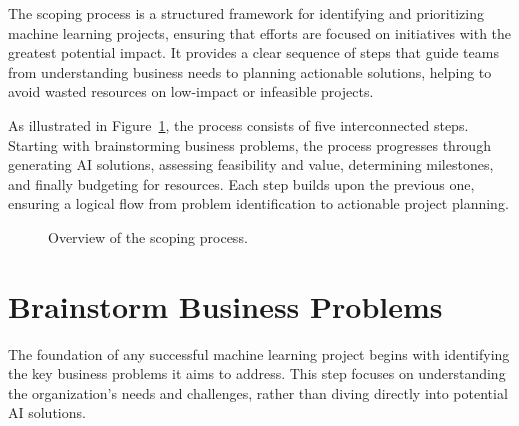 \documentclass[12pt,openany]{book}
\begin{document}
The scoping process is a structured framework for identifying and prioritizing machine learning projects, ensuring that efforts are focused on initiatives with the greatest potential impact. It provides a clear sequence of steps that guide teams from understanding business needs to planning actionable solutions, helping to avoid wasted resources on low-impact or infeasible projects. \newline

As illustrated in Figure~\ref{fig:scoping_process}, the process consists of five interconnected steps. Starting with brainstorming business problems, the process progresses through generating AI solutions, assessing feasibility and value, determining milestones, and finally budgeting for resources. Each step builds upon the previous one, ensuring a logical flow from problem identification to actionable project planning. 


\begin{figure}[htbp]
\centering
{}
\caption{Overview of the scoping process.}
\label{fig:scoping_process}
\end{figure}



\section{Brainstorm Business Problems}

The foundation of any successful machine learning project begins with identifying the key business problems it aims to address. This step focuses on understanding the organization's needs and challenges, rather than diving directly into potential AI solutions.
\newline
\end{document}
